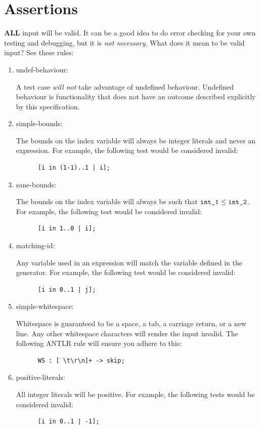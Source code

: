 \documentclass{article}
\newcommand{\code}[1]{\texttt{\textmd{#1}}}
\newcommand{\assertiondest}[1]{\hypertarget{#1}{#1:}}
\begin{document}
\section{Assertions}
\textbf{ALL} input will be valid. It can be a good idea to do error checking for your own
testing and debugging, but it is \textit{not necessary}. What does it mean to be valid input?
See these rules:
\begin{enumerate}
  \item
    \assertiondest{undef-behaviour}
    A test case \textit{will not} take advantage of undefined behaviour. Undefined behaviour is
    functionality that does not have an outcome described explicitly by this specification.
  \item
    \assertiondest{simple-bounds}
    The bounds on the index variable will always be integer literals and never an expression. For
    example, the following test would be considered invalid:
    \begin{lstlisting}
      [i in (1-1)..1 | i];
    \end{lstlisting}
  \item
    \assertiondest{sane-bounds}
    The bounds on the index variable will always be such that $\code{int\_1} \leq
    \code{int\_2}$. For example, the following test would be considered invalid:
    \begin{lstlisting}
      [i in 1..0 | i];
    \end{lstlisting}
  \item
    \assertiondest{matching-id}
    Any variable used in an expression will match the variable defined in the generator. For
    example, the following test would be considered invalid:
    \begin{lstlisting}
      [i in 0..1 | j];
    \end{lstlisting}
  \item
    \assertiondest{simple-whitespace}
    Whitespace is guaranteed to be a space, a tab, a carriage return, or a new
    line. Any other whitespace characters will render the input invalid. The following ANTLR rule
    will ensure you adhere to this:
    \begin{lstlisting}
      WS : [ \t\r\n]+ -> skip;
    \end{lstlisting}
  \item
    \assertiondest{positive-literals}
    All integer literals will be positive. For example, the following tests would be considered
    invalid:
    \begin{lstlisting}
      [i in 0..1 | -1];

\end{lstlisting}
\end{enumerate}
\end{document}
